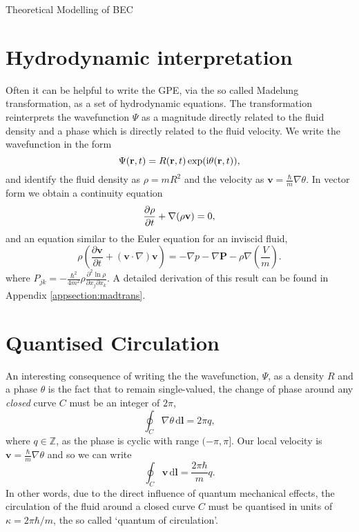 \begin{chapter}{\label{cha:theoretical_model}Theoretical Modelling of BEC}
\section{\label{section:hydrodynamic} Hydrodynamic interpretation}
	Often it can be helpful to write the GPE, via the so called Madelung transformation, as a set of hydrodynamic equations. The transformation reinterprets the wavefunction $\Psi$ as a magnitude directly related to the fluid density and a phase which is directly related to the fluid velocity. We write the wavefunction in the form
	\begin{equation}
		\Psi({\bf r},t) = R({\bf r},t)\exp (\mathrm{i}\theta({\bf r},t)),
	\end{equation}
	 and identify the fluid density as $\rho=mR^2$ and the velocity as $\mathbf{v} = \frac{\hbar}{m}\nabla\theta$.
	In vector form we obtain a continuity equation
	\begin{equation}
	  \frac{\partial \rho}{\partial t} + \nabla(\rho{\bf v}) = 0,
	  \label{eq:MTcont}
	\end{equation}
	and an equation similar to the Euler equation for an inviscid fluid,
	\begin{equation}
	\rho\left( \frac{\partial \mathbf{v}}{\partial t} + \left( \mathbf{v} \cdot \nabla \right)\mathbf{v} \right) = -\nabla p - \nabla \mathbf{P} - \rho \nabla \left(\frac{V}{m}\right).
	\end{equation}
	where $P_{jk} = -\frac{\hbar^2}{4m^2}\rho\frac{\partial^2\ln{\rho}}{\partial x_j \partial x_k}$.
	A detailed derivation of this result can be found in Appendix \ref{appsection:madtrans}.

\section{\label{section:quantisedcirculation} Quantised Circulation}
An interesting consequence of writing the the wavefunction, $\Psi$, as a density $R$ and a phase $\theta$ is the fact that to remain single-valued, the change of phase around any {\it closed} curve $C$ must be an integer of $2\pi$,
\begin{equation}
	\oint_C \! \nabla \theta  \, \mathrm{d}\mathbf{l} = 2 \pi q,
\end{equation}
where $q\in\mathbb{Z}$, as the phase is cyclic with range $(-\pi,\pi]$. Our local velocity is $\mathbf{v} = \frac{\hbar}{m}\nabla\theta$ and so we can write
\begin{equation}
	\oint_C \! \mathbf{v} \, \mathrm{d}\mathbf{l} = \frac{2 \pi \hbar}{m}q.
\end{equation}
In other words, due to the direct influence of quantum mechanical effects, the circulation of the fluid around a closed curve $C$ must be quantised in units of $\kappa = 2 \pi \hbar/m$, the so called `quantum of circulation'.


\end{chapter}

